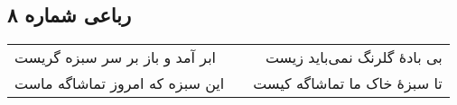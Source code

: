 \begin{center}
\section*{رباعی شماره ۸}
\label{sec:sh008}
\begin{longtable}{l p{0.5cm} r}
ابر آمد و باز بر سر سبزه گریست
&&
بی بادهٔ گلرنگ نمی‌باید زیست
\\
این سبزه که امروز تماشاگه ماست
&&
تا سبزهٔ خاک ما تماشاگه کیست
\\
\end{longtable}
\end{center}

